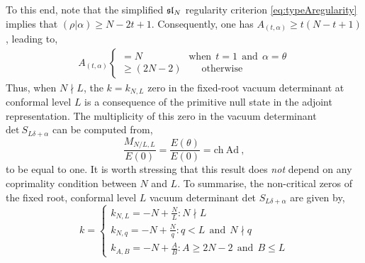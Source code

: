 To this end, note that the simplified $\mathfrak{sl}_N$ regularity criterion \eqref{eq:typeAregularity} implies that $(\rho|\alpha) \geqslant N - 2t + 1$. Consequently, one has $A_{(t,\alpha)} \geqslant t(N-t+1)$, leading to,
\begin{equation}
\begin{split}
    A_{(t,\alpha)} \begin{cases}
        = N \qquad \qquad \ \ \ \mathrm{when} \ \ t = 1 \ \ \mathrm{and} \ \ \alpha = \theta \\
        \geqslant (2N-2) \qquad \mathrm{otherwise}
    \end{cases}
\end{split}
\end{equation}
Thus, when $N \nmid L$, the $k = k_{N,L}$ zero in the fixed-root vacuum determinant at conformal level $L$ is a consequence of the primitive null state in the adjoint representation. The multiplicity of this zero in the vacuum determinant $\mathrm{det}~S_{L \delta + \alpha}$ can be computed from,
\begin{equation}
    \frac{M_{N/L,L}}{E(0)} = \frac{E(\theta)}{E(0)} = \mathrm{ch~Ad}~,
\end{equation}
to be equal to one. It is worth stressing that this result does \emph{not} depend on any coprimality condition between $N$ and $L$. To summarise, the non-critical zeros of the fixed root, conformal level $L$ vacuum determinant det $S_{L \delta + \alpha}$ are given by,
\begin{equation} \label{eq: typeAprelimzero}
    k = \begin{cases}
        k_{N,L} = -N + \frac{N}{L}: N \nmid L \\ 
        k_{N,q} = -N + \frac{N}{q}: q < L \ \ \mathrm{and} \ \ N \nmid q \\
        k_{A,B} = -N + \frac{A}{B}: A \geqslant 2N-2 \ \ \mathrm{and} \ \ B \leqslant L
    \end{cases}
\end{equation}

